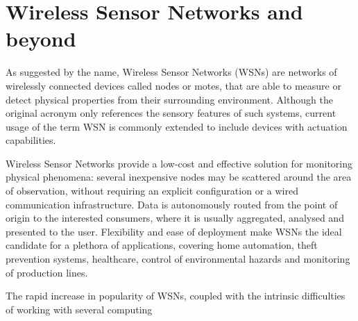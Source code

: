 \section{Wireless Sensor Networks and beyond}
As suggested by the name, Wireless Sensor Networks (WSNs) are networks of wirelessly connected devices called nodes or motes, that are able to measure or detect physical properties from their surrounding environment. Although the original acronym only references the sensory features of such systems, current usage of the term WSN is commonly extended to include devices with actuation capabilities.

Wireless Sensor Networks provide a low-cost and effective solution for monitoring physical phenomena: several inexpensive nodes may be scattered around the area of observation, without requiring an explicit configuration or a wired communication infrastructure. Data is autonomously routed from the point of origin to the interested consumers, where it is usually aggregated, analysed and presented to the user. Flexibility and ease of deployment make WSNs the ideal candidate for a plethora of applications, covering home automation, theft prevention systems, healthcare, control of environmental hazards and monitoring of production lines.

The rapid increase in popularity of WSNs, coupled with the intrinsic difficulties of working with several computing 
